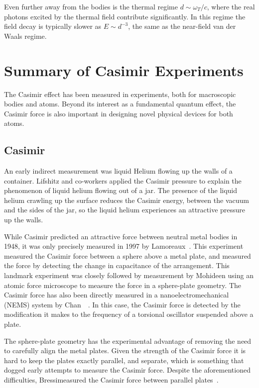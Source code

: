     Even further away from the bodies is the thermal regime $d\sim \omega_T/c$, where the real photons excited by the 
    thermal field contribute significantly.  In this regime the field decay is typically slower as $E\sim d^{-3}$,
    the same as the near-field van der Waals regime.  

\section{Summary of Casimir Experiments}
\label{sec:expt_review}
The Casimir effect has been measured in experiments, both for macroscopic bodies and atoms.
Beyond its interest as a fundamental quantum effect, the Casimir force is also important 
in designing novel physical devices for both atoms.

\subsection{Casimir}
An early indirect measurement was liquid Helium flowing up the walls of a container.  
Lifshitz and co-workers applied the Casimir pressure to explain the phenomenon of liquid helium
flowing out of a jar.  The presence of the liquid helium crawling up the surface reduces the Casimir energy,
between the vacuum and the sides of the jar, so the liquid helium experiences an attractive pressure up the walls.  

While Casimir predicted an attractive force between neutral metal bodies in 1948,
it was only precisely measured in 1997 by Lamoreaux~\cite{Lamoreaux1997}.   
This experiment measured the Casimir force between a sphere above a metal plate,
and measured the force by detecting the change in capacitance of the arrangement.  
This landmark experiment was closely followed by measurement by Mohideen\etal\cite{Mohideen1998}
using an atomic force microscope to measure the force in a sphere-plate geometry.  
The Casimir force has also been directly measured in a nanoelectromechanical (NEMS) system 
by Chan~\etal~\cite{Chan2001}.  In this case, the Casimir force is detected by the modification it
makes to the frequency of a torsional oscillator suspended above a plate.  

The sphere-plate geometry has the experimental advantage of removing the need to carefully
align the metal plates. Given the strength of the Casimir force it is hard to keep the plates exactly parallel,
and separate, which is something that dogged early attempts to measure the Casimir force.
Despite the aforementioned difficulties, Bressi\etal measured the Casimir force between parallel plates~\cite{Bressi2002}.  

